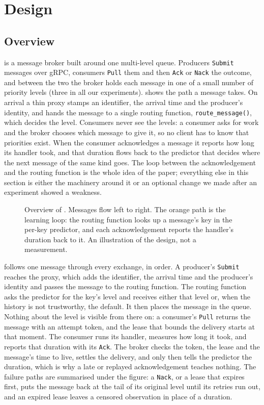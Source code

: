 \section{Design}\label{sec:design}

\subsection{Overview}\label{sec:overview}

\sys{} is a message broker built around one multi-level queue. Producers \texttt{Submit} messages over gRPC, consumers \texttt{Pull} them and
then \texttt{Ack} or \texttt{Nack} the outcome, and between the two the broker holds each message in one of a small number
of priority levels (three in all our experiments).  shows the path a message takes. On arrival
a thin proxy stamps an identifier, the arrival time and the producer's identity, and hands the message to a single routing
function, \texttt{route\_message()}, which decides the level. Consumers never see the levels: a consumer asks for work and
the broker chooses which message to give it, so no client has to know that priorities exist. When the consumer
acknowledges a message it reports how long its handler took, and that duration flows back to the predictor that decides
where the next message of the same kind goes. The loop between the acknowledgement and the routing function is the whole
idea of the paper; everything else in this section is either the machinery around it or an optional change we made after
an experiment showed a weakness.

\begin{figure}[t]
  \centering
  
  \caption{Overview of \sys{}. Messages flow left to right. The orange path is the learning loop: the routing function
  looks up a message's key in the per-key predictor, and each acknowledgement reports the handler's duration back to it.
  An illustration of the design, not a measurement.}
  \label{fig:architecture}
\end{figure}

 follows one message through every exchange, in order. A producer's \texttt{Submit} reaches the proxy, which
adds the identifier, the arrival time and the producer's identity and passes the message to the routing function. The routing
function asks the predictor for the key's level and receives either that level or, when the history is not trustworthy, the
default. It then places the message in the queue. Nothing about the level is visible from there on: a consumer's \texttt{Pull}
returns the message with an attempt token, and the lease that bounds the delivery starts at that moment. The consumer runs
its handler, measures how long it took, and reports that duration with its \texttt{Ack}. The broker checks the token, the lease and the
message's time to live, settles the delivery, and only then tells the predictor the duration, which is why a late or replayed
acknowledgement teaches nothing. The failure paths are summarised under the figure: a \texttt{Nack}, or a lease that expires first, puts the
message back at the tail of its original level until its retries run out, and an expired lease leaves a censored observation in place of a duration.

